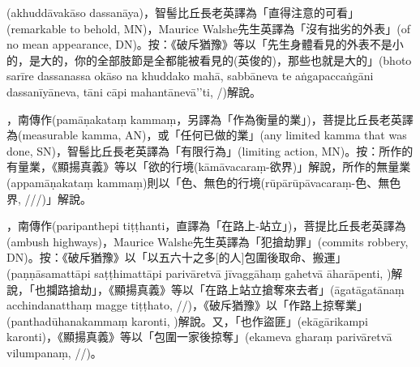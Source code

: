 \startitemgroup[noteitems]
\item{}(akhuddāvakāso dassanāya)，智髻比丘長老英譯為「直得注意的可看」(remarkable to behold, MN)，Maurice Walshe先生英譯為「沒有拙劣的外表」(of no mean appearance, DN)。按：《破斥猶豫》等以「先生身體看見的外表不是小的，是大的，你的全部肢節是全都能被看見的(英俊的)，那些也就是大的」(bhoto sarīre dassanassa okāso na khuddako mahā, sabbāneva te aṅgapaccaṅgāni dassanīyāneva, tāni cāpi mahantānevā’’ti, /)解說。
\stopitemgroup

\startitemgroup[noteitems]
\item{}，南傳作(pamāṇakataṃ kammaṃ，另譯為「作為衡量的業」)，菩提比丘長老英譯為(measurable kamma, AN)，或「任何已做的業」(any limited kamma that was done, SN)，智髻比丘長老英譯為「有限行為」(limiting action, MN)。按：所作的有量業，《顯揚真義》等以「欲的行境(kāmāvacaraṃ-欲界)」解說，所作的無量業(appamāṇakataṃ kammaṃ)則以「色、無色的行境(rūpārūpāvacaraṃ-色、無色界, ///)」解說。
\stopitemgroup

\startitemgroup[noteitems]
\item{}，南傳作(paripanthepi tiṭṭhanti，直譯為「在路上-站立」)，菩提比丘長老英譯為(ambush highways)，Maurice Walshe先生英譯為「犯搶劫罪」(commits robbery, DN)。按：《破斥猶豫》以「以五六十之多[的人]包圍後取命、搬運」(paṇṇāsamattāpi saṭṭhimattāpi parivāretvā jīvaggāhaṃ gahetvā āharāpenti, )解說，「也攔路搶劫」，《顯揚真義》等以「在路上站立搶奪來去者」(āgatāgatānaṃ acchindanatthaṃ magge tiṭṭhato, //)，《破斥猶豫》以「作路上掠奪業」(panthadūhanakammaṃ karonti, )解說。又，「也作盜匪」(ekāgārikampi karonti)，《顯揚真義》等以「包圍一家後掠奪」(ekameva gharaṃ parivāretvā vilumpanaṃ, //)。
\stopitemgroup

